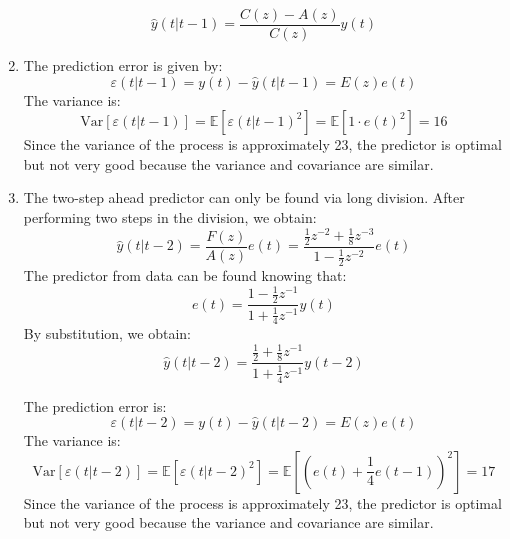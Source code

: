 \begin{enumerate}
        \[\hat{y}(t|t-1)=\dfrac{C(z)-A(z)}{C(z)}y(t)\]
    \item The prediction error is given by:
        \[\varepsilon(t|t-1)=y(t)-\hat{y}(t|t-1)=E(z)e(t)\]
        The variance is:
        \[\text{Var}\left[\varepsilon(t|t-1)\right]=\mathbb{E}\left[{\varepsilon(t|t-1)}^2\right]=\mathbb{E}\left[1 \cdot {e(t)}^2\right]=16\]
        Since the variance of the process is approximately 23, the predictor is optimal but not very good because the variance and covariance are similar.
    \item The two-step ahead predictor can only be found via long division. 
        After performing two steps in the division, we obtain:
        \[\hat{y}(t|t-2)=\dfrac{F(z)}{A(z)}e(t)=\dfrac{\frac{1}{2}z^{-2}+\frac{1}{8}z^{-3}}{1-\frac{1}{2}z^{-2}}e(t)\]
        The predictor from data can be found knowing that:
        \[e(t)=\dfrac{1-\frac{1}{2}z^{-1}}{1+\frac{1}{4}z^{-1}}y(t)\]
        By substitution, we obtain:
        \[\hat{y}(t|t-2)=\dfrac{\frac{1}{2}+\frac{1}{8}z^{-1}}{1+\frac{1}{4}z^{-1}}y(t-2)\]
        
        The prediction error is:
        \[\varepsilon(t|t-2)=y(t)-\hat{y}(t|t-2)=E(z)e(t)\]
        The variance is: 
        \[\text{Var}\left[\varepsilon(t|t-2)\right]=\mathbb{E}\left[{\varepsilon(t|t-2)}^2\right]=\mathbb{E}\left[{\left( e(t) +\frac{1}{4}e(t-1) \right)}^2\right]=17\]
        Since the variance of the process is approximately 23, the predictor is optimal but not very good because the variance and covariance are similar.
\end{enumerate}